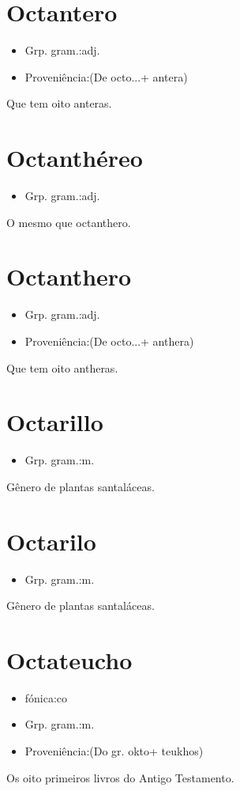 \section{Octantero}
\begin{itemize}
\item {Grp. gram.:adj.}
\end{itemize}
\begin{itemize}
\item {Proveniência:(De \textunderscore octo...\textunderscore  + \textunderscore antera\textunderscore )}
\end{itemize}
Que tem oito anteras.
\section{Octanthéreo}
\begin{itemize}
\item {Grp. gram.:adj.}
\end{itemize}
O mesmo que \textunderscore octanthero\textunderscore .
\section{Octanthero}
\begin{itemize}
\item {Grp. gram.:adj.}
\end{itemize}
\begin{itemize}
\item {Proveniência:(De \textunderscore octo...\textunderscore  + \textunderscore anthera\textunderscore )}
\end{itemize}
Que tem oito antheras.
\section{Octarillo}
\begin{itemize}
\item {Grp. gram.:m.}
\end{itemize}
Gênero de plantas santaláceas.
\section{Octarilo}
\begin{itemize}
\item {Grp. gram.:m.}
\end{itemize}
Gênero de plantas santaláceas.
\section{Octateucho}
\begin{itemize}
\item {fónica:co}
\end{itemize}
\begin{itemize}
\item {Grp. gram.:m.}
\end{itemize}
\begin{itemize}
\item {Proveniência:(Do gr. \textunderscore okto\textunderscore  + \textunderscore teukhos\textunderscore )}
\end{itemize}
Os oito primeiros livros do \textunderscore Antigo Testamento\textunderscore .
